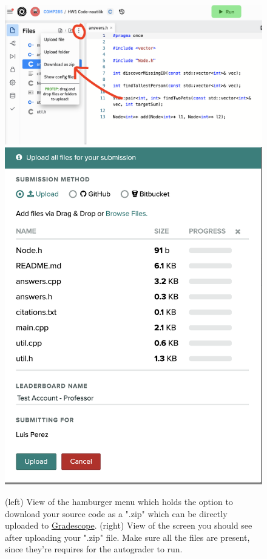 \documentclass [12pt]{article}
\begin{document}
\begin{figure}[h!]
\centering
\includegraphics[scale=0.3]{replit-download.png}
\includegraphics[scale=0.3]{gradescope-upload.png}
\caption{(left) View of the hamburger menu which holds the option to download your source code as a ".zip" which can be directly uploaded to \href{https://www.gradescope.com/courses/350304}{Gradescope}. (right) View of the screen you should see after uploading your ".zip" file. Make sure all the files are present, since they're requires for the autograder to run.}
\label{fig:replit_download}
\end{figure}
\end{document}
